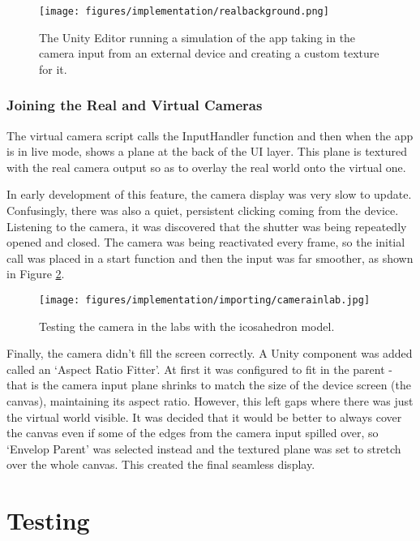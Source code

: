 \documentclass[12pt, a4paper]{article}
\begin{document}
\begin{figure}[]
    \centering
    \texttt{[image: figures/implementation/realbackground.png]}
        \caption{The Unity Editor running a simulation of the app taking in the camera input from an external device and creating a custom texture for it.}
        \label{fig:camerabackground}
\end{figure}

\subsubsection{Joining the Real and Virtual Cameras}
The virtual camera script calls the InputHandler function and then when the app is in live mode, shows a plane at the back of the UI layer. This plane is textured with the real camera output so as to overlay the real world onto the virtual one.

In early development of this feature, the camera display was very slow to update. Confusingly, there was also a quiet, persistent clicking coming from the device. Listening to the camera, it was discovered that the shutter was being repeatedly opened and closed. The camera was being reactivated every frame, so the initial call was placed in a start function and then the input was far smoother, as shown in Figure \ref{fig:camerainlab}.

\begin{figure}[]
    \centering
    \texttt{[image: figures/implementation/importing/camerainlab.jpg]}
        \caption{Testing the camera in the labs with the icosahedron model.}
        \label{fig:camerainlab}
\end{figure}

Finally, the camera didn't fill the screen correctly. A Unity component was added called an `Aspect Ratio Fitter'. At first it was configured to fit in the parent - that is the camera input plane shrinks to match the size of the device screen (the canvas), maintaining its aspect ratio. However, this left gaps where there was just the virtual world visible. It was decided that it would be better to always cover the canvas even if some of the edges from the camera input spilled over, so `Envelop Parent' was selected instead and the textured plane was set to stretch over the whole canvas. This created the final seamless display.

\section{Testing}
\end{document}
